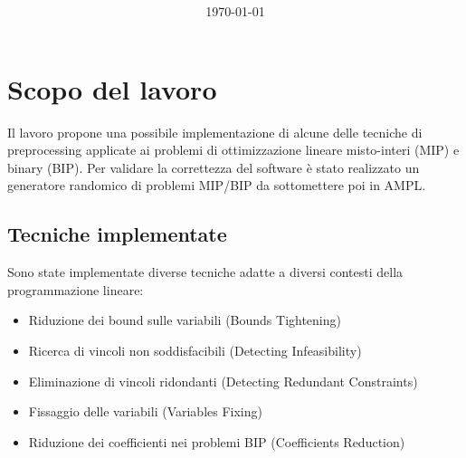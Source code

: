 \documentclass{article}
\title{
\vspace{2in}
\textmd{\textbf{\hmwkClass}}\\
\vspace{0.1in}\large{\textit{\hmwkUniversita}}
\vspace{3in}
}
\author{\textbf{\hmwkAuthorName}}
\date{\today} %
\begin{document}
\maketitle



\newpage
\tableofcontents
\newpage



\section{Scopo del lavoro}

Il lavoro propone una possibile implementazione di alcune delle tecniche di preprocessing applicate ai problemi di ottimizzazione lineare misto-interi (MIP) e binary (BIP). Per validare la correttezza del software è stato realizzato un generatore randomico di problemi MIP/BIP da sottomettere poi in AMPL. 

\subsection{Tecniche implementate}

Sono state implementate diverse tecniche adatte a diversi contesti della programmazione lineare:

\begin{itemize}
\item Riduzione dei bound sulle variabili (Bounds Tightening)
\item Ricerca di vincoli non soddisfacibili (Detecting Infeasibility)
\item Eliminazione di vincoli ridondanti (Detecting Redundant Constraints)
\item Fissaggio delle variabili (Variables Fixing)
\item Riduzione dei coefficienti nei problemi BIP (Coefficients Reduction)
\end{itemize}
\end{document}
